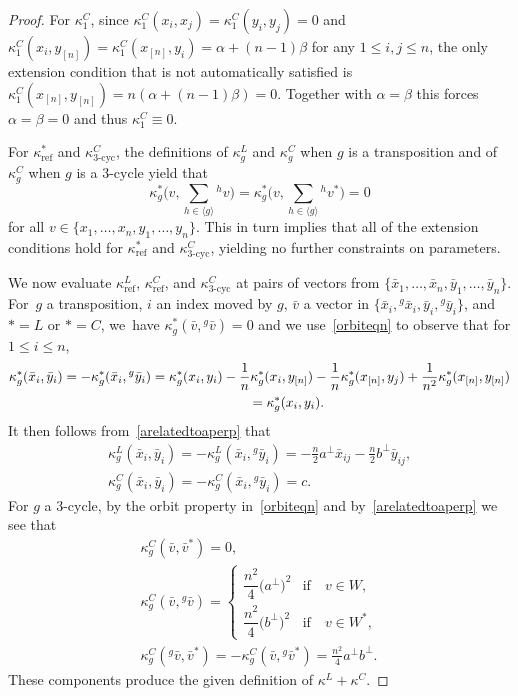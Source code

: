 \documentclass[pdftex]{sigma}
\numberwithin{equation}{section}
\newcommand{\actby}[1]{{}^{#1}}
\newcommand{\actbylessspace}[1]{{}^{#1}\!}
\DeclareMathOperator{\refl}{ref}
\DeclareMathOperator{\tri}{3-cyc}
\begin{document}
\begin{proof}
For $\kappa^C_1$, since $\kappa^C_1(x_i,x_j)=\kappa^C_1(y_i,y_j)=0$ and
$\kappa^C_1(x_i,y_{[n]})=\kappa^C_1(x_{[n]},y_i)=\alpha+(n-1)\beta$ for
any $1 \leq i,j \leq n$, the only extension condition that is not
automatically satisfied is $\kappa^C_1(x_{[n]},y_{[n]})=n(\alpha+(n-1)\beta)=0$.
Together with $\alpha=\beta$ this forces $\alpha=\beta=0$ and thus $\kappa^C_1 \equiv 0$.

For $\kappa^*_{\refl}$ and $\kappa^C_{\tri}$, the definitions of $\kappa^L_g$
and $\kappa^C_g$ when $g$ is a transposition and of $\kappa^C_g$ when $g$
is a $3$-cycle yield that
\begin{equation}
\label{orbiteqn}
\kappa^*_g\bigg(v,\sum\limits_{h \in \langle g \rangle} \actby{h}v\bigg)=
\kappa^*_g\bigg(v,\sum\limits_{h \in \langle g \rangle} \actby{h}v^*\bigg)=0
\end{equation}
for all $v \in \{x_1,\dots,x_n,y_1,\dots,y_n\}$.
This in turn implies that all of the extension conditions hold
for $\kappa^*_{\refl}$ and $\kappa^C_{\tri}$, yielding no further constraints
on parameters.

We now evaluate $\kappa^L_{\refl}$, $\kappa^C_{\refl}$, and $\kappa^C_{\tri}$
at pairs of vectors
from $\{\bar{x}_1,\dots,\bar{x}_n,\bar{y}_1,\dots,\bar{y}_n\}$. For~$g$ a transposition, $i$ an index moved by $g$, $\bar{v}$
a vector in $\{\bar{x}_i,\actby{g}\bar{x}_i,\bar{y}_i,\actby{g}\bar{y}_i\}$,
and $*=L$ or $*=C$, we~have $\kappa^*_g(\bar{v},\actby{g}\bar{v})=0$
and we use~\eqref{orbiteqn} to observe that for $1 \leq i \leq n$,
\begin{gather*}
\kappa^*_g(\bar{x}_i,\bar{y}_i)=-\kappa^*_g(\bar{x}_i,\actby{g}\bar{y}_i)=
\kappa^*_g(x_i,y_i)-\frac{1}{n}\kappa^*_g(x_i,y_{[n]})
-\frac{1}{n}\kappa^*_g(x_{[n]},y_j)+\frac{1}{n^2}\kappa^*_g(x_{[n]},y_{[n]})
\\ \hphantom{\kappa^*_g(\bar{x}_i,\bar{y}_i)}
{}=\kappa^*_g(x_i,y_i).
\end{gather*}
It then follows from~\eqref{arelatedtoaperp} that
\begin{gather*}
\kappa^L_g(\bar{x}_i,\bar{y}_i)=-\kappa^L_g(\bar{x}_i,\actby{g}\bar{y}_i)
=-\frac{n}{2}a^\perp \bar{x}_{ij}-\frac{n}{2}b^\perp \bar{y}_{ij},
\\
\kappa^C_g(\bar{x}_i,\bar{y}_i)=-\kappa^C_g(\bar{x}_i,\actby{g}\bar{y}_i)=c.
\end{gather*}
For $g$ a $3$-cycle, by the orbit property in~\eqref{orbiteqn} and by~\eqref{arelatedtoaperp}
we see that
\begin{gather*}
\kappa^C_g(\bar{v},\bar{v}^*)=0, \\
\kappa^C_g(\bar{v},\actby{g}\bar{v})=
\begin{cases}
 	\dfrac{n^2}{4}\big(a^\perp\big)^2 & \text{if}\quad v \in W, \\[2ex]
 	\dfrac{n^2}{4}\big(b^\perp\big)^2 & \text{if}\quad v \in W^*,
\end{cases}
\\
\kappa^C_g(\actbylessspace{g}\bar{v},\bar{v}^*)=-\kappa^C_g(\bar{v},\actbylessspace{g}\bar{v}^*)=
\frac{n^2}{4}a^\perp b^\perp.
\end{gather*}
These components produce the given definition of $\kappa^L+\kappa^C$.
\end{proof}
\end{document}
